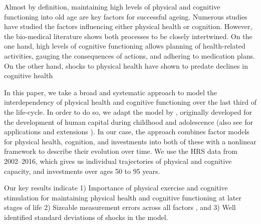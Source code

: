 \blindmathfalse
\noindent%

    Almost by definition, maintaining high levels of physical and cognitive functioning into old age are key factors for successful ageing. Numerous studies have studied the factors influencing either physical health or cognition. However, the bio-medical literature shows both processes to be closely intertwined. On the one hand, high levels of cognitive functioning allows planning of health-related activities, gauging the consequences of actions, and adhering to medication plans. On the other hand, shocks to physical health have shown to predate declines in cognitive health \citep{Schiele.Schmitz.2021}

    In this paper, we take a broad and systematic approach to model the interdependency of physical health and cognitive functioning over the last third of the life-cycle. In order to do so, we adapt the model by \citet{Cunha.2010}, originally developed for the development of human capital during childhood and adolescence (also see for applications and extensions \citet{NixEtAl.2020, AgostinelliWiswall.2016.2, Freyberger.2021}). In our case, the approach combines factor models for physical health, cognition, and investments into both of these with a nonlinear framework to describe their evolution over time. We use the HRS data from 2002--2016, which gives us individual trajectories of physical and cognitive capacity, and investments over ages 50 to 95 years.

    Our key results indicate
    1\string) Importance of physical exercise and cognitive stimulation for maintaining physical health and cognitive functioning at later stages of life
    2\string) Sizeable measurement errors across all factors
    , and 3\string) Well identified standard deviations of shocks in the model.










